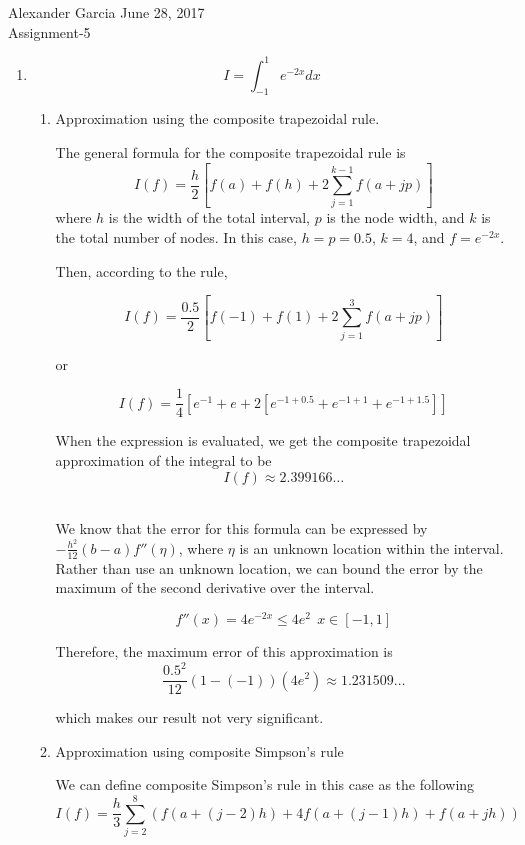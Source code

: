 \documentclass[11pt]{article}
\begin{document}
\lstset{stringstyle=\ttfamily,
	showstringspaces=false,
	basicstyle=\small}

\begin{center} Alexander Garcia \hfill June 28, 2017 \\ Assignment-5 \end{center}

\medskip

\begin{enumerate}

	\item $$I = \int_{-1}^{1}e^{-2x} dx$$

	\begin{enumerate}

		\item Approximation using the composite trapezoidal rule.

		The general formula for the composite trapezoidal rule is
		\[
		I(f) = \frac{h}{2}[f(a)+f(h)+2\sum_{j=1}^{k-1}f(a+jp)]
		\]
		where $h$ is the width of the total interval, $p$ is the node width, and $k$ is the total number of nodes. In this case, $h=p = 0.5$, $k=4$, and $f = e^{-2x}$.

		Then, according to the rule,

		\[
		I(f) = \frac{0.5}{2}[f(-1) + f(1) + 2\sum_{j=1}^{3}f(a+jp)]
		\]

		or

		\[
		I(f) = \frac{1}{4}[e^{-1} + e + 2[e^{-1+0.5} + e^{-1+1} + e^{-1+1.5}]]
		\]

		When the expression is evaluated, we get the composite trapezoidal approximation of the integral to be
		\[
		I(f) \approx 2.399166\ldots
		\] \

		We know that the error for this formula can be expressed by $-\frac{h^2}{12}(b-a)f''(\eta)$, where $\eta$ is an unknown location within the interval. Rather than use an unknown location, we can bound the error by the maximum of the second derivative over the interval.

		\[f''(x) = 4e^{-2x} \leq 4e^2\ \ x\in[-1,1]\]

		Therefore, the maximum error of this approximation is
		\[
		\frac{0.5^2}{12}(1-(-1))(4e^2) \approx 1.231509\ldots
		\]

		which makes our result not very significant. \\

		\item Approximation using composite Simpson's rule

		We can define composite Simpson's rule in this case as the following
		\[
		I(f) = \frac{h}{3}\sum_{j=2}^{8}(f(a+(j-2)h) + 4f(a+(j-1)h) + f(a+jh))
		\]


\end{enumerate}
\end{enumerate}
\end{document}
